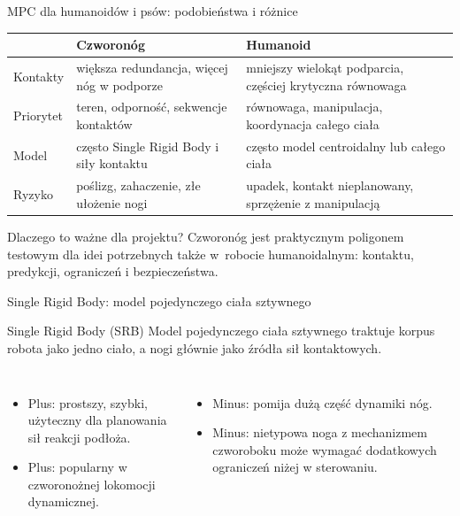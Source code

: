 \begin{frame}{MPC dla humanoidów i psów: podobieństwa i różnice}
\scriptsize
\begin{tabular}{p{}p{}p{}}
\toprule
 & \textbf{Czworonóg} & \textbf{Humanoid}\\
\midrule
Kontakty & większa redundancja, więcej nóg w podporze & mniejszy wielokąt podparcia, częściej krytyczna równowaga\\[0.25em]
Priorytet & teren, odporność, sekwencje kontaktów & równowaga, manipulacja, koordynacja całego ciała\\[0.25em]
Model & często Single Rigid Body i siły kontaktu & często model centroidalny lub całego ciała\\[0.25em]
Ryzyko & poślizg, zahaczenie, złe ułożenie nogi & upadek, kontakt nieplanowany, sprzężenie z manipulacją\\
\bottomrule
\end{tabular}
\vspace{0.6em}
\begin{block}{Dlaczego to ważne dla projektu?}
\small Czworonóg jest praktycznym poligonem testowym dla idei potrzebnych także w~robocie humanoidalnym: kontaktu, predykcji, ograniczeń i bezpieczeństwa.
\end{block}
\end{frame}

\begin{frame}{Single Rigid Body: model pojedynczego ciała sztywnego}
\begin{block}{Single Rigid Body (SRB)}
Model pojedynczego ciała sztywnego traktuje korpus robota jako jedno ciało, a nogi głównie jako źródła sił kontaktowych.
\end{block}
\begin{columns}[T,onlytextwidth]
\begin{itemize}
  \item Plus: prostszy, szybki, użyteczny dla planowania sił reakcji podłoża.
  \item Plus: popularny w czworonożnej lokomocji dynamicznej.
\end{itemize}
\begin{itemize}
  \item Minus: pomija dużą część dynamiki nóg.
  \item Minus: nietypowa noga z mechanizmem czworoboku może wymagać dodatkowych ograniczeń niżej w sterowaniu.
\end{itemize}
\end{columns}
\end{frame}

